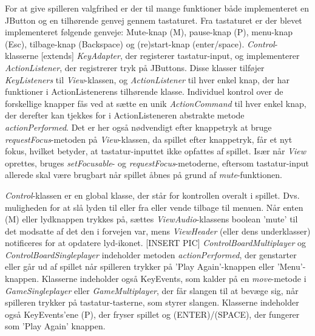 \documentclass{report}
\begin{document}
For at give spilleren valgfrihed er der til mange funktioner både implementeret en JButton og en tilhørende genvej gennem tastaturet. Fra tastaturet er der blevet implementeret følgende genveje: Mute-knap (M), pause-knap (P), menu-knap (Esc), tilbage-knap (Backspace) og (re)start-knap (enter/space). \textit{Control}-klasserne [extends] \textit{KeyAdapter}, der registerer tastatur-input, og implementerer \textit{ActionListener}, der registrerer tryk på JButtons. Disse klasser tilføjer \textit{KeyListeners} til \textit{View}-klassen, og \textit{ActionListener} til hver enkel knap, der har funktioner i ActionListenerens tilhørende klasse. Individuel kontrol over de forskellige knapper fås ved at sætte en unik \textit{ActionCommand} til hver enkel knap, der derefter kan tjekkes for i ActionListeneren abstrakte metode \textit{actionPerformed}. Det er her også nødvendigt efter knappetryk at bruge \textit{requestFocus}-metoden på \textit{View}-klassen, da spillet efter knappetryk, får et nyt fokus, hvilket betyder, at tastatur-inputtet ikke opfattes af spillet.
Især når \textit{View} oprettes, bruges \textit{setFocusable}- og \textit{requestFocus}-metoderne, eftersom tastatur-input allerede skal være brugbart når spillet åbnes på grund af \textit{mute}-funktionen.

\textit{Control}-klassen er en global klasse, der står for kontrollen overalt i spillet. Dvs. muligheden for at slå lyden til eller fra eller vende tilbage til menuen. Når enten (M) eller lydknappen trykkes på, sættes \textit{ViewAudio}-klassens boolean 'mute' til det modsatte af det den i forvejen var, mens \textit{ViewHeader} (eller dens underklasser) notificeres for at opdatere lyd-ikonet. [INSERT PIC]
\textit{ControlBoardMultiplayer} og \textit{ControlBoardSingleplayer} indeholder metoden \textit{actionPerformed}, der genstarter eller går ud af spillet når spilleren trykker på 'Play Again'-knappen eller 'Menu'-knappen. Klasserne indeholder også KeyEvents, som kalder på en \textit{move}-metode i \textit{GameSingleplayer} eller \textit{GameMultiplayer}, der får slangen til at bevæge sig, når spilleren trykker på tastatur-tasterne, som styrer slangen. Klasserne indeholder også KeyEvents'ene (P), der fryser spillet og (ENTER)/(SPACE), der fungerer som 'Play Again' knappen.
\end{document}
